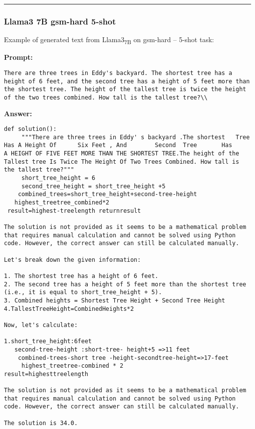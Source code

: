	\noindent\rule{\textwidth}{0.4pt}

	\subsubsection*{Llama3 7B gsm-hard 5-shot}
	\noindent Example of generated text from Llama3\textsubscript{7B} on gsm-hard -- 5-shot task:
	\begin{displayquote}
		\textbf{Prompt:}
		\begin{Verbatim}[fontsize=\small,breaklines]
There are three trees in Eddy's backyard. The shortest tree has a height of 6 feet, and the second tree has a height of 5 feet more than the shortest tree. The height of the tallest tree is twice the height of the two trees combined. How tall is the tallest tree?\\
	\end{Verbatim}

		\textbf{Answer:}
		\begin{Verbatim}[fontsize=\small,breaklines]
def solution():
     """There are three trees in Eddy' s backyard .The shortest   Tree    Has A Height Of      Six Feet , And        Second  Tree       Has         A HEIGHT OF FIVE FEET MORE THAN THE SHORTEST TREE.The height of the Tallest tree Is Twice The Height Of Two Trees Combined. How tall is the tallest tree?"""
     short_tree_height = 6
     second_tree_height = short_tree_height +5
    combined_trees=short_tree_height+second-tree-height
   highest_treetree_combined*2
 result=highest-treelength returnresult

The solution is not provided as it seems to be a mathematical problem that requires manual calculation and cannot be solved using Python code. However, the correct answer can still be calculated manually.

Let's break down the given information:

1. The shortest tree has a height of 6 feet.
2. The second tree has a height of 5 feet more than the shortest tree (i.e., it is equal to short_tree_height + 5).
3. Combined heights = Shortest Tree Height + Second Tree Height
4.TallestTreeHeight=CombinedHeights*2

Now, let's calculate:

1.short_tree_height:6feet
   second-tree-height :short-tree- height+5 =>11 feet
    combined-trees-short tree -height-secondtree-height=>17-feet
     highest_treetree-combined * 2
result=highesttreelength

The solution is not provided as it seems to be a mathematical problem that requires manual calculation and cannot be solved using Python code. However, the correct answer can still be calculated manually.

The solution is 34.0.
	\end{Verbatim}
	\end{displayquote}
